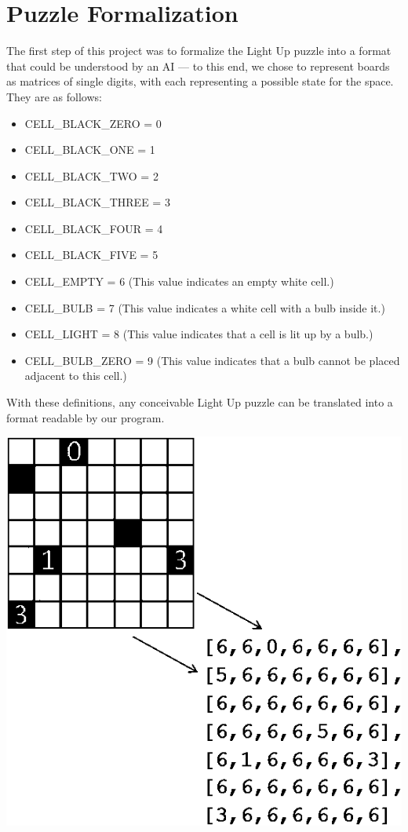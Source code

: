 \documentclass{article} %
\begin{document}
\section{Puzzle Formalization}

The first step of this project was to formalize the Light Up puzzle into a format that could be understood by an AI — to this end, we chose to represent boards as matrices of single digits, with each representing a possible state for the space. They are as follows:

\begin{itemize}
\item[] CELL\_BLACK\_ZERO = 0
\item[] CELL\_BLACK\_ONE = 1
\item[] CELL\_BLACK\_TWO = 2
\item[] CELL\_BLACK\_THREE = 3
\item[] CELL\_BLACK\_FOUR = 4
\item[] CELL\_BLACK\_FIVE = 5
\item[] CELL\_EMPTY = 6 (This value indicates an empty white cell.)
\item[] CELL\_BULB = 7 (This value indicates a white cell with a bulb inside it.)
\item[] CELL\_LIGHT = 8 (This value indicates that a cell is lit up by a bulb.)
\item[] CELL\_BULB\_ZERO = 9 (This value indicates that a bulb cannot be placed adjacent to this cell.)
\end{itemize}

With these definitions, any conceivable Light Up puzzle can be translated into a format readable by our program.

\begin{center}
\includegraphics[width=\textwidth]{Formalization}
\end{center}
\end{document}
